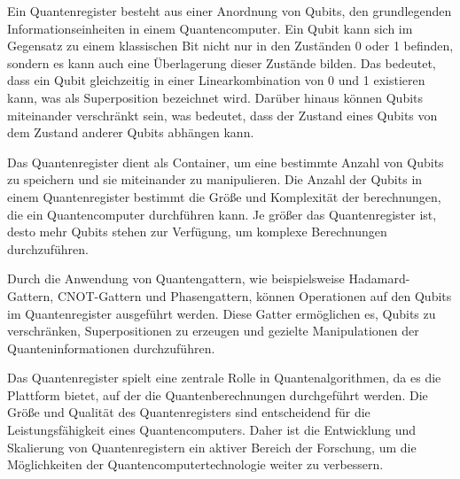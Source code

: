 Ein Quantenregister besteht aus einer Anordnung von Qubits, den grundlegenden Informationseinheiten in einem Quantencomputer. Ein Qubit kann sich im Gegensatz zu einem klassischen Bit nicht nur in den Zuständen 0 oder 1 befinden, sondern es kann auch eine Überlagerung dieser Zustände bilden. Das bedeutet, dass ein Qubit gleichzeitig in einer Linearkombination von 0 und 1 existieren kann, was als Superposition bezeichnet wird. Darüber hinaus können Qubits miteinander verschränkt sein, was bedeutet, dass der Zustand eines Qubits von dem Zustand anderer Qubits abhängen kann.

Das Quantenregister dient als Container, um eine bestimmte Anzahl von Qubits zu speichern und sie miteinander zu manipulieren. Die Anzahl der Qubits in einem Quantenregister bestimmt die Größe und Komplexität der berechnungen, die ein Quantencomputer durchführen kann. Je größer das Quantenregister ist, desto mehr Qubits stehen zur Verfügung, um komplexe Berechnungen durchzuführen.

Durch die Anwendung von Quantengattern, wie beispielsweise Hadamard-Gattern, CNOT-Gattern und Phasengattern, können Operationen auf den Qubits im Quantenregister ausgeführt werden. Diese Gatter ermöglichen es, Qubits zu verschränken, Superpositionen zu erzeugen und gezielte Manipulationen der Quanteninformationen durchzuführen.

Das Quantenregister spielt eine zentrale Rolle in Quantenalgorithmen, da es die Plattform bietet, auf der die Quantenberechnungen durchgeführt werden. Die Größe und Qualität des Quantenregisters sind entscheidend für die Leistungsfähigkeit eines Quantencomputers. Daher ist die Entwicklung und Skalierung von Quantenregistern ein aktiver Bereich der Forschung, um die Möglichkeiten der Quantencomputertechnologie weiter zu verbessern.

